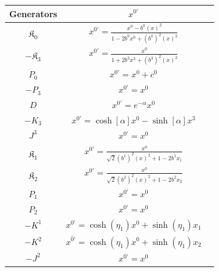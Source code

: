\documentclass[%
 reprint,
superscriptaddress,
 amsmath,amssymb,
 aps,
]{revtex4-2}
\begin{document}
\begin{widetext}
\begin{center}
\begin{table}[!htb]
        \begin{minipage}{.5\linewidth}
        \begin{tabular}{|c||c|c|}
        \hline
             \rule{0pt}{16pt} Generators & $x^{{0}\prime}$\\
             \hline
             \hline
            \rule{0pt}{16pt} $\mathfrak{K}_{{0}}$ & $x^{{0}\prime}=\frac{x^{{0}}-b^{{0}}(x)^2}{1-2b^{{0}}x^{{0}}+(b^{{0}})^2(x)^2}$\\
             \hline
            \rule{0pt}{16pt} $-\mathfrak{K}_{{3}}$ & $x^{{0}\prime}=\frac{x^{{0}}}{1+2b^{{3}}x^{{3}}+(b^{{3}})^2(x)^2}$ \\
             \hline
             \rule{0pt}{16pt} $P_{{0}}$& $x^{{0}\prime}=x^{{0}}+c^{{0}} $\\
             \hline
             \rule{0pt}{16pt} $-P_{{3}}$& $x^{{0}\prime}=x^{{0}}$  \\
             \hline
             \rule{0pt}{16pt} $D$ & $x^{{0}\prime} = e^{-\alpha}x^{0}$ \\
             \hline
             \rule{0pt}{16pt} $-K_{3}$ & $x^{{0}\prime} = \cosh[\alpha]x^{0}-\sinh[\alpha] x^{3}$ \\
             \hline
             \rule{0pt}{16pt} $J^{3}$ & $ x^{{0}\prime}=x^{{0}}$ \\
             \hline
             \rule{0pt}{16pt} $\mathfrak{K}_{1}$ & $x^{{0}\prime}=\frac{x^{{{0}}}}{ \sqrt{2}(b^{1})^{2}(x)^2+1-2b^{1}x_{1}}$ \\
             \hline
             \rule{0pt}{16pt} $\mathfrak{K}_{2}$ &  $x^{{0}\prime}=\frac{x^{{{0}}}}{ \sqrt{2}(b^{2})^{2}(x)^2+1-2b^{2}x_{2}}$ \\
             \hline
              \rule{0pt}{16pt} $P_{1}$ & $ x^{{0}\prime}=x^{{0}}$  \\
              \hline
              \rule{0pt}{16pt} $P_{2}$ & $ x^{{0}\prime}=x^{{0}}$  \\
              \hline
               \rule{0pt}{16pt} $-K^{1}$ &  $ x^{{0}\prime}=\cosh{(\eta_{1})}x^{{0}}+\sinh{(\eta_{1})}x_{{1}}$ \\
               \hline
               \rule{0pt}{16pt} $-K^{2}$ & $ x^{\hat{0}\prime}=\cosh{(\eta_{1})}x^{{0}}+\sinh{(\eta_{1})}x_{{2}}$ \\
               \hline
               \rule{0pt}{16pt} $-J^{2}$ & $ x^{{0}\prime}=x^{{0}}$ \\
               \hline

\end{tabular}
\end{minipage}
\end{table}
\end{center}
\end{widetext}
\end{document}
